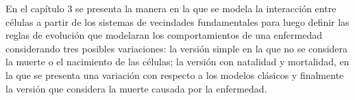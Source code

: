 En el capítulo 3 se presenta la manera en la que se modela la interacción entre células a partir de los sistemas de vecindades fundamentales para luego definir las reglas de evolución que modelaran los comportamientos de una enfermedad considerando tres posibles variaciones: la versión simple en la que no se considera la muerte o el nacimiento de las células; la versión con natalidad y mortalidad, en la que se presenta una variación con respecto a los modelos clásicos y finalmente la versión que considera la muerte causada por la enfermedad.

